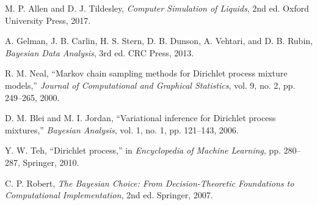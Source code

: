 \documentclass[11pt,a4paper]{article}
\begin{document}
\begin{thebibliography}{99}
M. P. Allen and D. J. Tildesley, \textit{Computer Simulation of Liquids}, 2nd ed. Oxford University Press, 2017.

A. Gelman, J. B. Carlin, H. S. Stern, D. B. Dunson, A. Vehtari, and D. B. Rubin, \textit{Bayesian Data Analysis}, 3rd ed. CRC Press, 2013.

R. M. Neal, ``Markov chain sampling methods for Dirichlet process mixture models,'' \textit{Journal of Computational and Graphical Statistics}, vol. 9, no. 2, pp. 249--265, 2000.

D. M. Blei and M. I. Jordan, ``Variational inference for Dirichlet process mixtures,'' \textit{Bayesian Analysis}, vol. 1, no. 1, pp. 121--143, 2006.

Y. W. Teh, ``Dirichlet process,'' in \textit{Encyclopedia of Machine Learning}, pp. 280--287, Springer, 2010.

C. P. Robert, \textit{The Bayesian Choice: From Decision-Theoretic Foundations to Computational Implementation}, 2nd ed. Springer, 2007.

\end{thebibliography}
\end{document}
